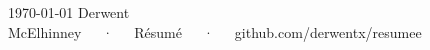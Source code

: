 \documentclass[11pt, a4paper]{derwent-cv}
\begin{document}
\makedercvheader[C]

\makecvfooter
  {\today}
  {Derwent McElhinney~~~·~~~Résumé~~~·~~~github.com/derwentx/resumee}
  {\thepage}






% 
% 
% 
% 




\end{document}
